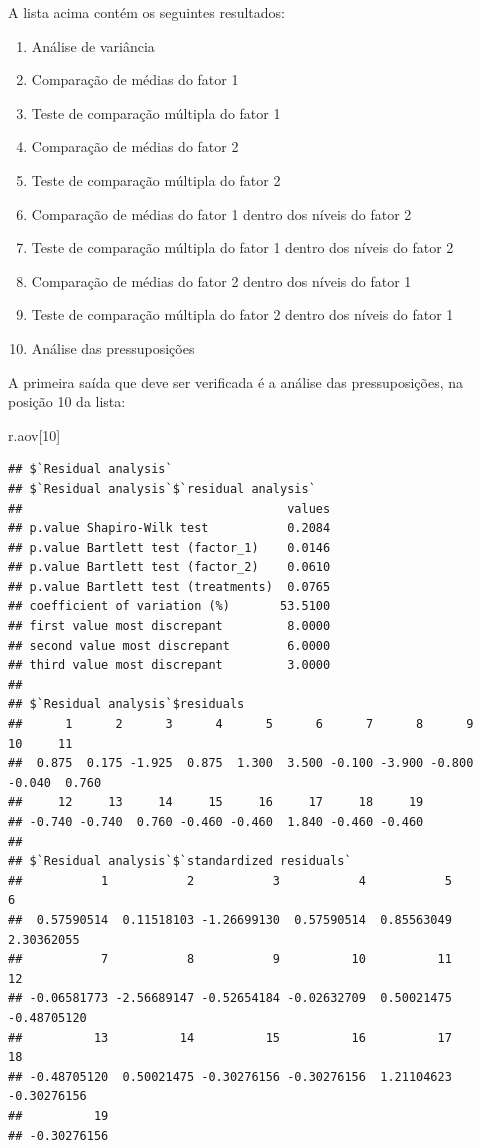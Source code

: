 \documentclass[
]{article}
\newenvironment{Shaded}{\begin{snugshade}}{\end{snugshade}}
\newcommand{\DecValTok}[1]{\textcolor[rgb]{0.00,0.00,0.81}{#1}}
\newcommand{\NormalTok}[1]{#1}
\providecommand{\tightlist}{%
  \setlength{\itemsep}{0pt}\setlength{\parskip}{0pt}}
\begin{document}
A lista acima contém os seguintes resultados:

\begin{enumerate}
\def\labelenumi{\arabic{enumi}.}
\tightlist
\item
  Análise de variância
\item
  Comparação de médias do fator 1
\item
  Teste de comparação múltipla do fator 1
\item
  Comparação de médias do fator 2\\
\item
  Teste de comparação múltipla do fator 2
\item
  Comparação de médias do fator 1 dentro dos níveis do fator 2
\item
  Teste de comparação múltipla do fator 1 dentro dos níveis do fator 2
\item
  Comparação de médias do fator 2 dentro dos níveis do fator 1
\item
  Teste de comparação múltipla do fator 2 dentro dos níveis do fator 1
\item
  Análise das pressuposições
\end{enumerate}

A primeira saída que deve ser verificada é a análise das pressuposições, na posição 10 da lista:

\begin{Shaded}
\begin{Highlighting}[]
\NormalTok{r.aov[}\DecValTok{10}\NormalTok{]}
\end{Highlighting}
\end{Shaded}

\begin{verbatim}
## $`Residual analysis`
## $`Residual analysis`$`residual analysis`
##                                     values
## p.value Shapiro-Wilk test           0.2084
## p.value Bartlett test (factor_1)    0.0146
## p.value Bartlett test (factor_2)    0.0610
## p.value Bartlett test (treatments)  0.0765
## coefficient of variation (%)       53.5100
## first value most discrepant         8.0000
## second value most discrepant        6.0000
## third value most discrepant         3.0000
## 
## $`Residual analysis`$residuals
##      1      2      3      4      5      6      7      8      9     10     11 
##  0.875  0.175 -1.925  0.875  1.300  3.500 -0.100 -3.900 -0.800 -0.040  0.760 
##     12     13     14     15     16     17     18     19 
## -0.740 -0.740  0.760 -0.460 -0.460  1.840 -0.460 -0.460 
## 
## $`Residual analysis`$`standardized residuals`
##           1           2           3           4           5           6 
##  0.57590514  0.11518103 -1.26699130  0.57590514  0.85563049  2.30362055 
##           7           8           9          10          11          12 
## -0.06581773 -2.56689147 -0.52654184 -0.02632709  0.50021475 -0.48705120 
##          13          14          15          16          17          18 
## -0.48705120  0.50021475 -0.30276156 -0.30276156  1.21104623 -0.30276156 
##          19 
## -0.30276156
\end{verbatim}
\end{document}

